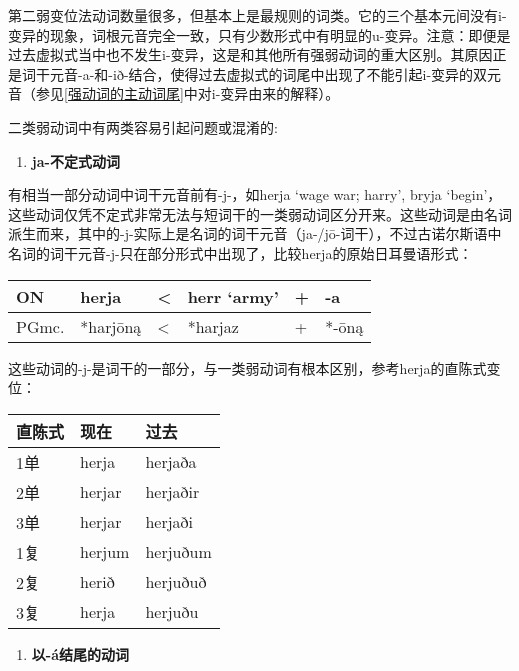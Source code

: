 第二弱变位法动词数量很多，但基本上是最规则的词类。它的三个基本元间没有i-变异的现象，词根元音完全一致，只有少数形式中有明显的u-变异。注意：即便是过去虚拟式当中也不发生i-变异，这是和其他所有强弱动词的重大区别。其原因正是词干元音-a-和-ið-结合，使得过去虚拟式的词尾中出现了不能引起i-变异的双元音（参见\ref{强动词的主动词尾}中对i-变异由来的解释）。

二类弱动词中有两类容易引起问题或混淆的:

\begin{enumerate}
  \def\labelenumi{\arabic{enumi})}
  \item
        \textbf{ja-不定式动词}
\end{enumerate}

有相当一部分动词中词干元音前有-j-，如herja `wage war; harry', bryja
`begin'，这些动词仅凭不定式非常无法与短词干的一类弱动词区分开来。这些动词是由名词派生而来，其中的-j-实际上是名词的词干元音（ja-/jō-词干），不过古诺尔斯语中名词的词干元音-j-只在部分形式中出现了，比较herja的原始日耳曼语形式：

\begin{longtable}{llllll}
  \toprule
  ON    & herja    & \textless{} & herr `army' & + & -a    \\
  \midrule
  \endhead
  \bottomrule
  \endfoot
  PGmc. & *harjōną & \textless{} & *harjaz     & + & *-ōną \\
\end{longtable}

这些动词的-j-是词干的一部分，与一类弱动词有根本区别，参考herja的直陈式变位：

\begin{longtable}{lll}
  \toprule
  直陈式 & 现在     & 过去       \\
  \midrule
  \endhead
  \bottomrule
  \endfoot
  1单  & herja  & herjaða  \\
  2单  & herjar & herjaðir \\
  3单  & herjar & herjaði  \\
  1复  & herjum & herjuðum \\
  2复  & herið  & herjuðuð \\
  3复  & herja  & herjuðu  \\
\end{longtable}

\begin{enumerate}
  \def\labelenumi{\arabic{enumi})}
  \setcounter{enumi}{1}
  \item
        \textbf{以-á结尾的动词}
\end{enumerate}

